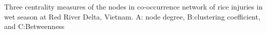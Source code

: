 Three centrality measures of the nodes in co-occurrence network of rice injuries in wet season at Red River Delta, Vietnam. A: node degree, B:clustering coefficient, and C:Betweenness
        \label{fig:nodepropRR_ws}